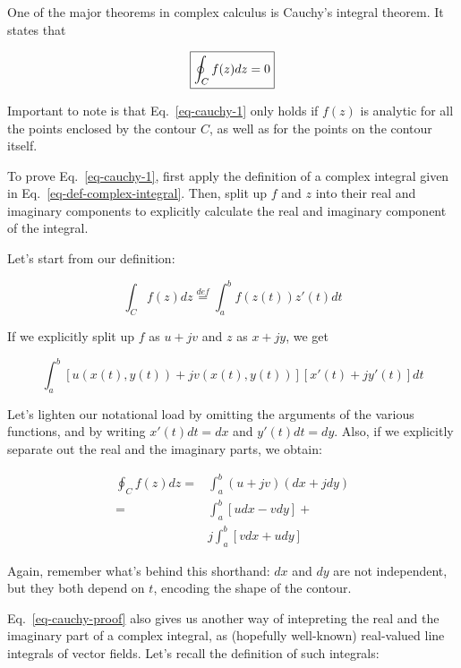 One of the major theorems in complex calculus is Cauchy's integral theorem. It states that 

\begin{equation}
\fbox{$\displaystyle
\oint_{{C}} f(z) dz = 0 \label{eq-cauchy-1}
$}
\end{equation}

Important to note is that Eq.~\ref{eq-cauchy-1} only holds if $f(z)$ is analytic for all the points enclosed by the contour ${C}$, as well as for the points on the contour itself.

\begin{cue}
To prove Eq.~\ref{eq-cauchy-1}, first apply the definition of a complex integral given in Eq.~\ref{eq-def-complex-integral}. Then, split up $f$ and $z$ into their real and imaginary components to explicitly calculate the real and imaginary component of the integral.
\end{cue}

Let's start from our definition:

\begin{equation}
  \int_{C}f(z)dz \stackrel{def}{=} \int_a^b f\left(z(t)\right) z'(t) dt
\end{equation}

If we explicitly split up $f$ as $u+jv$ and $z$ as $x+jy$, we get

\begin{equation}
\int_a^b\left[u\left(x(t),y(t)\right)+jv\left(x(t),y(t)\right)\right] \left[x'(t)+jy'(t)\right] dt 
\end{equation}

Let's lighten our notational load by omitting the arguments of the various functions, and by writing $x'(t)dt=dx$ and $y'(t)dt=dy$. Also, if we explicitly separate out the real and the imaginary parts, we obtain:

\begin{align}
\oint_{C}f(z)dz = & \int_a^b\left(u+jv\right)(dx+jdy)
\nonumber \\
  = & \int_a^b\left[udx-vdy\right] + \nonumber \\
  & j \int_a^b\left[vdx+udy\right] \label{eq-cauchy-proof}
\end{align}

Again, remember what's behind this shorthand: $dx$ and $dy$ are not independent, but they both depend on $t$, encoding the shape of the contour.

Eq.~\ref{eq-cauchy-proof} also gives us another way of intepreting the real and the imaginary part of a complex integral, as (hopefully well-known) real-valued line integrals of vector fields. Let's recall the definition of such integrals:

